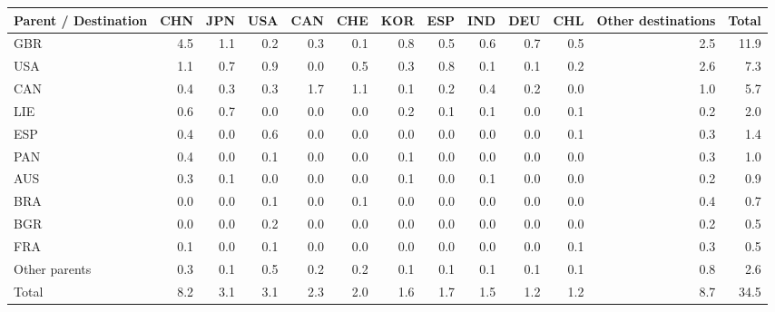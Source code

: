 \begin{tabular}{lrrrrrrrrrrrr}
\toprule
Parent / Destination & CHN & JPN & USA & CAN & CHE & KOR & ESP & IND & DEU & CHL & Other destinations & Total \\
\midrule
GBR & 4.5 & 1.1 & 0.2 & 0.3 & 0.1 & 0.8 & 0.5 & 0.6 & 0.7 & 0.5 & 2.5 & 11.9 \\
USA & 1.1 & 0.7 & 0.9 & 0.0 & 0.5 & 0.3 & 0.8 & 0.1 & 0.1 & 0.2 & 2.6 & 7.3 \\
CAN & 0.4 & 0.3 & 0.3 & 1.7 & 1.1 & 0.1 & 0.2 & 0.4 & 0.2 & 0.0 & 1.0 & 5.7 \\
LIE & 0.6 & 0.7 & 0.0 & 0.0 & 0.0 & 0.2 & 0.1 & 0.1 & 0.0 & 0.1 & 0.2 & 2.0 \\
ESP & 0.4 & 0.0 & 0.6 & 0.0 & 0.0 & 0.0 & 0.0 & 0.0 & 0.0 & 0.1 & 0.3 & 1.4 \\
PAN & 0.4 & 0.0 & 0.1 & 0.0 & 0.0 & 0.1 & 0.0 & 0.0 & 0.0 & 0.0 & 0.3 & 1.0 \\
AUS & 0.3 & 0.1 & 0.0 & 0.0 & 0.0 & 0.1 & 0.0 & 0.1 & 0.0 & 0.0 & 0.2 & 0.9 \\
BRA & 0.0 & 0.0 & 0.1 & 0.0 & 0.1 & 0.0 & 0.0 & 0.0 & 0.0 & 0.0 & 0.4 & 0.7 \\
BGR & 0.0 & 0.0 & 0.2 & 0.0 & 0.0 & 0.0 & 0.0 & 0.0 & 0.0 & 0.0 & 0.2 & 0.5 \\
FRA & 0.1 & 0.0 & 0.1 & 0.0 & 0.0 & 0.0 & 0.0 & 0.0 & 0.0 & 0.1 & 0.3 & 0.5 \\
Other parents & 0.3 & 0.1 & 0.5 & 0.2 & 0.2 & 0.1 & 0.1 & 0.1 & 0.1 & 0.1 & 0.8 & 2.6 \\
\midrule
Total & 8.2 & 3.1 & 3.1 & 2.3 & 2.0 & 1.6 & 1.7 & 1.5 & 1.2 & 1.2 & 8.7 & 34.5 \\
\bottomrule
\end{tabular}
